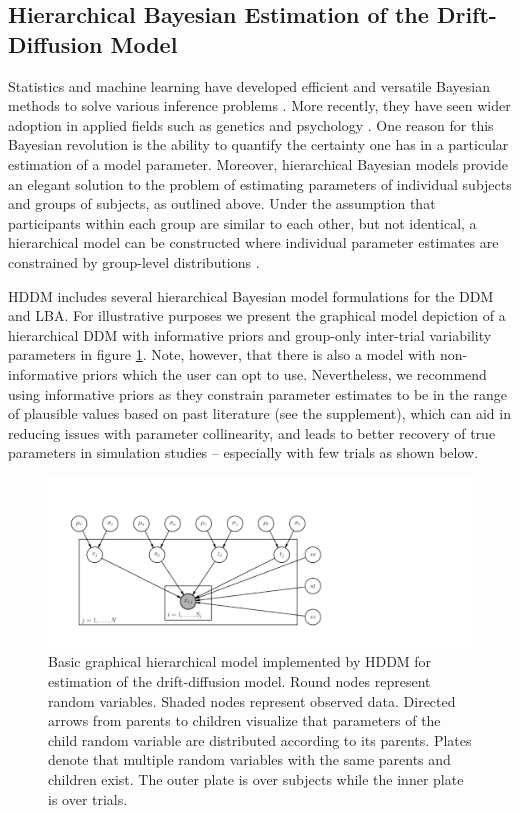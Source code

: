 \documentclass[letterpaper,10pt,english]{article}
\begin{document}
\subsection*{Hierarchical Bayesian Estimation of the Drift-Diffusion
Model}
\label{methods:hierarchical-bayesian-estimation}
Statistics and machine learning have developed efficient and versatile
Bayesian methods to solve various inference problems
\citep{Poirier06}. More recently, they have seen wider adoption in
applied fields such as genetics \citep{StephensBalding09} and
psychology \citep{ClemensDeSelenEtAl11}. One reason for this Bayesian
revolution is the ability to quantify the certainty one has in a
particular estimation of a model parameter. Moreover, hierarchical
Bayesian models provide an elegant solution to the problem of
estimating parameters of individual subjects and groups of subjects,
as outlined above. Under the assumption that participants within each
group are similar to each other, but not identical, a hierarchical
model can be constructed where individual parameter estimates are
constrained by group-level distributions
\citep{NilssonRieskampWagenmakers11,ShiffrinLeeKim08}.

HDDM includes several hierarchical Bayesian model formulations for the DDM and LBA. For illustrative purposes we present the graphical model depiction of a hierarchical DDM with informative priors and group-only inter-trial variability parameters in figure \ref{fig.graphical}. Note, however, that there is also a model with non-informative priors which the user can opt to use. Nevertheless, we recommend using informative priors as they constrain parameter estimates to be in the range of plausible values based on past literature \citep{MatzkeWagenmakers09} (see the supplement), which can aid in reducing issues with parameter collinearity, and leads to better recovery of true parameters in simulation studies -- especially with few trials as shown below.

\begin{figure}
\centering
\includegraphics[scale=.6]{graphical_hddm.pdf}
\caption{Basic graphical hierarchical model implemented by HDDM for
estimation of the drift-diffusion model. Round nodes represent random
variables. Shaded nodes represent observed data. Directed arrows from
parents to children visualize that parameters of the child random
variable are distributed according to its   parents. Plates denote
that multiple random variables with the same   parents and children
exist. The outer plate is over subjects while the inner plate is over trials.}
\label{fig.graphical}
\end{figure}
\end{document}
